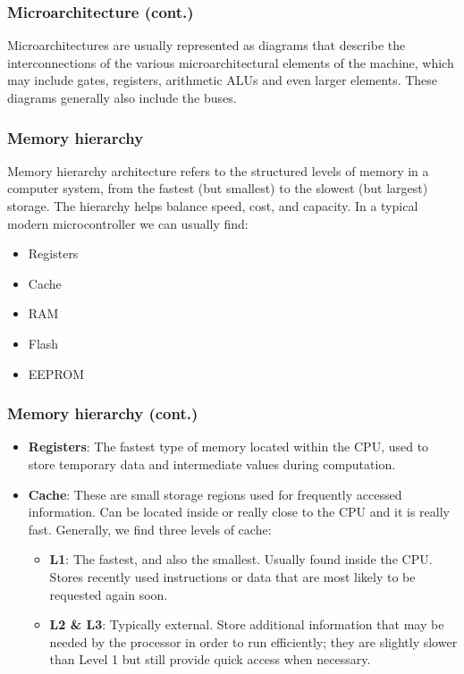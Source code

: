 \documentclass[aspectratio=169]{beamer}
\begin{document}
\begin{frame}
  \frametitle{Microarchitecture (cont.)}
  Microarchitectures are usually represented as diagrams that describe the interconnections of the various microarchitectural elements of the machine, which may include gates, registers, arithmetic ALUs and even larger elements. These diagrams generally also include the buses. 
\end{frame}

\begin{frame}
  \frametitle{Memory hierarchy}
  Memory hierarchy architecture refers to the structured levels of memory in a computer system, from the fastest (but smallest) to the slowest (but largest) storage. The hierarchy helps balance speed, cost, and capacity. In a typical modern microcontroller we can usually find:
  \begin{itemize}
    \item <2-> Registers
    \item <3-> Cache 
    \item <4-> RAM 
    \item <5-> Flash 
    \item <6-> EEPROM 
  \end{itemize}
\end{frame}

\begin{frame}
  \frametitle{Memory hierarchy (cont.)}
  \begin{itemize}
    \item <1-> \textbf{Registers}: The fastest type of memory located within the CPU, used to store temporary data and intermediate values during computation.
    \item <2-> \textbf{Cache}: These are small storage regions used for frequently accessed information. Can be located inside or really close to the CPU and it is really fast. Generally, we find three levels of cache:
    \begin{itemize}
      \item <3-> \textbf{L1}: The fastest, and also the smallest. Usually found inside the CPU. Stores recently used instructions or data that are most likely to be requested again soon.
      \item <3-> \textbf{L2 \& L3}: Typically external. Store additional information that may be needed by the processor in order to run efficiently; they are slightly slower than Level 1 but still provide quick access when necessary.
    \end{itemize}
  \end{itemize}
\end{frame}
\end{document}
